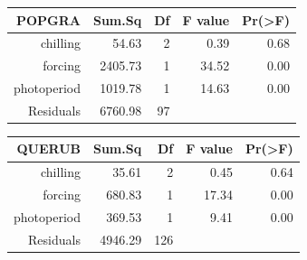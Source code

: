 \documentclass{article}\usepackage[]{graphicx}\usepackage[]{color}
\begin{document}
\begin{table}[ht]
\centering
\begin{tabular}{rrrrr}
  \hline
  POPGRA & Sum.Sq & Df & F value & Pr(>F) \\
 \hline
chilling & 54.63 &   2 & 0.39 & 0.68 \\ 
  forcing & 2405.73 &   1 & 34.52 & 0.00 \\ 
  photoperiod & 1019.78 &   1 & 14.63 & 0.00 \\ 
  Residuals & 6760.98 &  97 &  &  \\ 
   \hline
\end{tabular}
\end{table}
\begin{table}[ht]
\centering
\begin{tabular}{rrrrr}
  \hline
  QUERUB & Sum.Sq & Df & F value & Pr(>F) \\
 \hline
chilling & 35.61 &   2 & 0.45 & 0.64 \\ 
  forcing & 680.83 &   1 & 17.34 & 0.00 \\ 
  photoperiod & 369.53 &   1 & 9.41 & 0.00 \\ 
  Residuals & 4946.29 & 126 &  &  \\ 
   \hline
\end{tabular}
\end{table}
\end{document}
